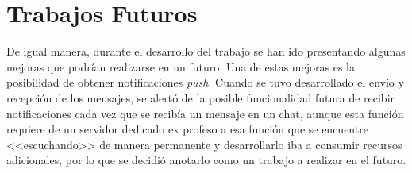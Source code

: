\section{Trabajos Futuros}
De igual manera, durante el desarrollo del trabajo se han ido presentando algunas mejoras que podrían realizarse en un futuro. Una de estas mejoras es la posibilidad de obtener notificaciones \textit{push}. Cuando se tuvo desarrollado el envío y recepción de los mensajes, se alertó de la posible funcionalidad futura de recibir notificaciones cada vez que se recibía un mensaje en un chat, aunque esta función requiere de un servidor dedicado ex profeso a esa función que se encuentre <<escuchando>> de manera permanente y desarrollarlo iba a consumir recursos adicionales, por lo que se decidió anotarlo como un trabajo a realizar en el futuro.